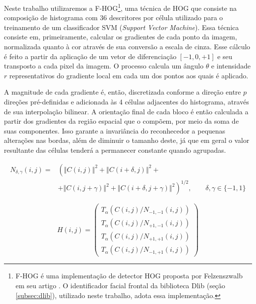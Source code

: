 Neste trabalho utilizaremos a F-HOG\footnote{F-HOG é uma implementação de detector HOG proposta por Felzenszwalb em seu artigo \cite{felzenszwalbObjectDetectionDiscriminatively}. O identificador facial frontal da biblioteca Dlib (seção \ref{subsec:dlib}), utilizado neste trabalho, adota essa implementação.}, uma técnica de HOG que consiste na composição de histograma com 36 descritores por célula utilizado para o treinamento de um classificador SVM (\textit{Support Vector Machine}).
Essa técnica consiste em, primeiramente, calcular os gradientes de cada ponto da imagem, normalizada quanto à cor através de sua conversão a escala de cinza.
Esse cálculo é feito a partir da aplicação de um vetor de diferenciação $[-1, 0, +1]$ e seu transposto a cada pixel da imagem.
O processo calcula um ângulo $\theta$ e intensidade $r$ representativos do gradiente local em cada um dos pontos aos quais é aplicado.

A magnitude de cada gradiente é, então, discretizada conforme a direção entre $p$ direções pré-definidas e adicionada às 4 células adjacentes do histograma, através de sua interpolação bilinear.
A orientação final de cada bloco é então calculada a partir dos gradientes da região espacial que o compõem, por meio da soma de suas componentes.
Isso garante a invariância do reconhecedor a pequenas alterações nas bordas, além de diminuir o tamanho deste, já que em geral o valor resultante das células tenderá a permanecer constante quando agrupadas.

\begin{equation}\label{eq:hog_energy}
    \begin{split}
        N_{\delta,\gamma}(i,j) = & \left(
            \left\Vert C(i,j) \right\Vert ^2 +
            \left\Vert C(i+\delta,j) \right\Vert ^2 +
            \right.\\ 
            & + \left. \left\Vert C(i,j+\gamma) \right\Vert ^2 +
            \left\Vert C(i+\delta,j+\gamma) \right\Vert ^2
            \right)^{1/2}, \qquad \delta,\gamma \in \{-1, 1\}
    \end{split}
\end{equation}

\begin{equation}\label{eq:hog_norm}
    H(i,j) = \left(\begin{matrix}
        T_\alpha(C(i,j)/N_{-1,-1}(i, j))\\
        T_\alpha(C(i,j)/N_{+1,-1}(i, j))\\
        T_\alpha(C(i,j)/N_{+1,+1}(i, j))\\
        T_\alpha(C(i,j)/N_{-1,+1}(i, j))
    \end{matrix}\right)
\end{equation}

